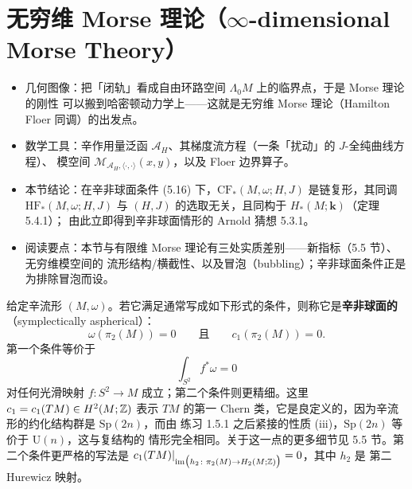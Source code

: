 
\section{无穷维 Morse 理论（\texorpdfstring{$\infty$}{infinity}-dimensional Morse Theory）}

\begin{keytakeaways}
\begin{itemize}
  \item 几何图像：把「闭轨」看成自由环路空间 $\Lambda_0M$ 上的临界点，于是 Morse 理论的刚性
        可以搬到哈密顿动力学上——这就是无穷维 Morse 理论（Hamilton Floer 同调）的出发点。
  \item 数学工具：辛作用量泛函 $\mathcal{A}_H$、其梯度流方程（一条「扰动」的 $J$-全纯曲线方程）、
        模空间 $\mathcal{M}_{\mathcal{A}_H,\langle\cdot,\cdot\rangle}(x,y)$，以及 Floer 边界算子。
  \item 本节结论：在辛非球面条件 (5.16) 下，$\mathrm{CF}_*(M,\omega;H,J)$ 是链复形，其同调
        $\mathrm{HF}_*(M,\omega;H,J)$ 与 $(H,J)$ 的选取无关，且同构于 $H_*(M;\mathbf{k})$（定理 5.4.1）；
        由此立即得到辛非球面情形的 Arnold 猜想 5.3.1。
  \item 阅读要点：本节与有限维 Morse 理论有三处实质差别——新指标（5.5 节）、无穷维模空间的
        流形结构/横截性、以及冒泡（bubbling）；辛非球面条件正是为排除冒泡而设。
\end{itemize}
\end{keytakeaways}

给定辛流形 $(M,\omega)$。若它满足通常写成如下形式的条件，则称它是\textbf{辛非球面的}
（symplectically aspherical）：
\begin{equation}\tag{5.16}
  \omega(\pi_2(M))=0\qquad\text{且}\qquad c_1(\pi_2(M))=0.
\end{equation}
第一个条件等价于
\[
  \int_{S^2}f^*\omega=0
\]
对任何光滑映射 $f\colon S^2\to M$ 成立；第二个条件则更精细。这里 $c_1=c_1(TM)\in H^2(M;\mathbb{Z})$
表示 $TM$ 的第一 Chern 类，它是良定义的，因为辛流形的约化结构群是 $\mathrm{Sp}(2n)$，而由
练习 1.5.1 之后紧接的性质 (iii)，$\mathrm{Sp}(2n)$ 等价于 $\mathrm{U}(n)$，这与复结构的
情形完全相同。关于这一点的更多细节见 5.5 节。第二个条件更严格的写法是
$c_1(TM)|_{\operatorname{im}\bigl(h_2\colon\pi_2(M)\to H_2(M;\mathbb{Z})\bigr)}=0$，其中 $h_2$ 是
第二 Hurewicz 映射。

